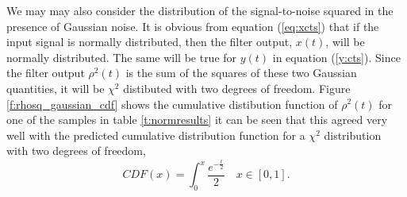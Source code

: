 We may may also consider the distribution of the signal-to-noise squared in
the presence of Gaussian noise. It is obvious from equation (\ref{eq:xcts})
that if the input signal is normally distributed, then the filter output,
$x(t)$, will be normally distributed. The same will be true for $y(t)$ in
equation (\ref{y:cts}). Since the filter output $\rho^2(t)$ is the sum of the
squares of these two Gaussian quantities, it will be $\chi^2$ distibuted with
two degrees of freedom. Figure \ref{f:rhosq_gaussian_cdf} shows the cumulative
distibution function of $\rho^2(t)$ for one of the samples in table
\ref{t:normresults} it can be seen that this agreed very well with the
predicted cumulative distribution function for a $\chi^2$ distribution with
two degrees of freedom,
\begin{equation}
CDF(x) = \int_0^x \frac{e^{-\frac{t}{2}}}{2} \quad x \in [0,1].
\end{equation}
